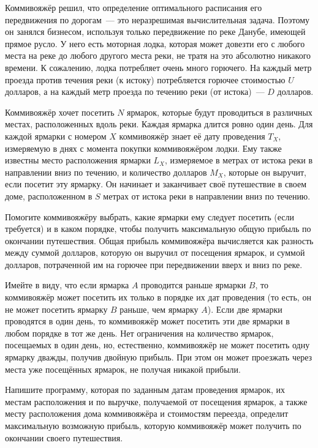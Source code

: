 Коммивояжёр решил, что определение оптимального расписания его передвижения по дорогам~--- это неразрешимая вычислительная задача. Поэтому он занялся бизнесом, используя только передвижение по реке Данубе, имеющей прямое русло. У него есть моторная лодка, которая может довезти его с любого места на реке до любого другого места реки, не тратя на это абсолютно никакого времени. К сожалению, лодка потребляет очень много горючего. На каждый метр проезда против течения реки (к истоку) потребляется горючее стоимостью $U$ долларов, а на каждый метр проезда по течению реки (от истока)~--- $D$ долларов.

Коммивояжёр хочет посетить $N$ ярмарок, которые будут проводиться в различных местах, расположенных вдоль реки. Каждая ярмарка длится ровно один день. Для каждой ярмарки с номером $X$ коммивояжёр знает её дату проведения $T_X$, измеряемую в днях с момента покупки коммивояжёром лодки. Ему также известны место расположения ярмарки $L_X$, измеряемое в метрах от истока реки в направлении вниз по течению, и количество долларов $M_X$, которые он выручит, если посетит эту ярмарку. Он начинает и заканчивает своё путешествие в своем доме, расположенном в $S$ метрах от истока реки в направлении вниз
по течению.

Помогите коммивояжёру выбрать, какие ярмарки ему следует посетить (если требуется) и в каком порядке, чтобы получить максимальную общую прибыль по окончании путешествия. Общая прибыль коммивояжёра вычисляется как разность между суммой долларов, которую он выручил от посещения ярмарок, и суммой долларов, потраченной им на горючее при передвижении вверх и вниз по реке.

Имейте в виду, что если ярмарка $A$ проводится раньше ярмарки $B$, то коммивояжёр может посетить их только в порядке их дат проведения (то есть, он не может посетить ярмарку $B$ раньше, чем ярмарку $A$). Если две ярмарки проводятся в один день, то коммивояжёр может посетить эти две ярмарки в любом порядке в тот же день. Нет ограничения на количество ярмарок, посещаемых в один день, но, естественно, коммивояжёр не может посетить одну ярмарку дважды, получив двойную прибыль. При этом он может проезжать через места уже посещённых ярмарок, не получая никакой прибыли.

Напишите программу, которая по заданным датам проведения ярмарок, их местам расположения и по выручке, получаемой от посещения ярмарок, а также месту расположения дома коммивояжёра и стоимостям переезда, определит максимальную возможную прибыль, которую коммивояжёр может получить по окончании своего путешествия.